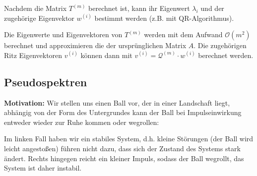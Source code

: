 
Nachdem die Matrix $T^{(m)}$ berechnet ist, kann ihr Eigenwert $\lambda_i$ und der zugehörige Eigenvektor $w^{(i)}$
bestimmt werden (z.B. mit QR-Algorithmus). 

Die Eigenwerte und Eigenvektoren von $T^{(m)}$ werden mit dem Aufwand $\mathcal{O}(m^2)$ berechnet und 
approximieren die der ursprünglichen Matrix $A$. Die zugehörigen Ritz Eigenvektoren $v^{(i)}$ können dann 
mit $v^{(i)}=\mathcal{Q}^{(m)}\cdot w^{(i)}$ berechnet werden.

\subsection{Pseudospektren}
\textbf{Motivation:}
Wir stellen uns einen Ball vor, der in einer Landschaft liegt, abhängig von der Form des Untergrundes kann der Ball 
bei Impulseinwirkung entweder wieder zur Ruhe kommen oder wegrollen:

\begin{center}
  
\end{center}

Im linken Fall haben wir ein stabiles System, d.h. kleine Störungen (der Ball wird leicht angestoßen) führen nicht dazu,
dass sich der Zustand des Systems stark ändert. Rechts hingegen reicht ein kleiner Impuls, sodass der Ball wegrollt, 
das System ist daher instabil.

